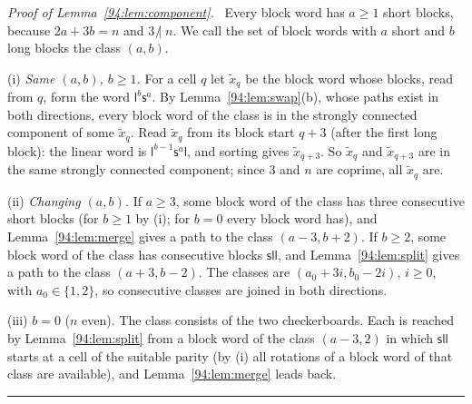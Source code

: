 \documentclass[10pt,a4paper]{article}
\newcommand{\qedmark}{\rule{1.1ex}{1.1ex}}
\newenvironment{proof}[1][Proof]{\par\smallskip\noindent\textit{#1.}\ }{\hfill\qedmark\par\smallskip}
\newcommand{\ndiv}{\mathrel{\not|}}           %
\begin{document}
\begin{proof}[Proof of Lemma~\ref{94:lem:component}]
Every block word has $a\ge1$ short blocks, because $2a+3b=n$ and $3\ndiv n$. We call the set of block words with
$a$ short and $b$ long blocks the class $(a,b)$.

(i) \emph{Same $(a,b)$, $b\ge1$.} For a cell $q$ let $\tilde x_q$ be the block word whose blocks, read from $q$, form the
word $\mathsf{l}^b\mathsf{s}^a$. By Lemma~\ref{94:lem:swap}(b), whose paths exist in both directions, every block
word of the class is in the strongly connected component of some $\tilde x_q$. Read $\tilde x_q$ from its block start $q+3$
(after the first long block): the linear word is $\mathsf{l}^{b-1}\mathsf{s}^a\mathsf{l}$, and sorting gives
$\tilde x_{q+3}$. So $\tilde x_q$ and $\tilde x_{q+3}$ are in the same strongly connected component; since $3$ and $n$ are coprime, all
$\tilde x_q$ are.

(ii) \emph{Changing $(a,b)$.} If $a\ge3$, some block word of the class has three consecutive short blocks (for
$b\ge1$ by (i); for $b=0$ every block word has), and Lemma~\ref{94:lem:merge} gives a path to the class
$(a-3,b+2)$. If $b\ge2$, some block word of the class has consecutive blocks $\mathsf{sll}$, and
Lemma~\ref{94:lem:split} gives a path to the class $(a+3,b-2)$. The classes are $(a_0+3i,b_0-2i)$, $i\ge0$, with
$a_0\in\{1,2\}$, so consecutive classes are joined in both directions.

(iii) \emph{$b=0$} ($n$ even). The class consists of the two checkerboards. Each is reached by
Lemma~\ref{94:lem:split} from a block word of the class $(a-3,2)$ in which $\mathsf{sll}$ starts at a cell of the
suitable parity (by (i) all rotations of a block word of that class are available), and
Lemma~\ref{94:lem:merge} leads back.
\end{proof}
\end{document}
